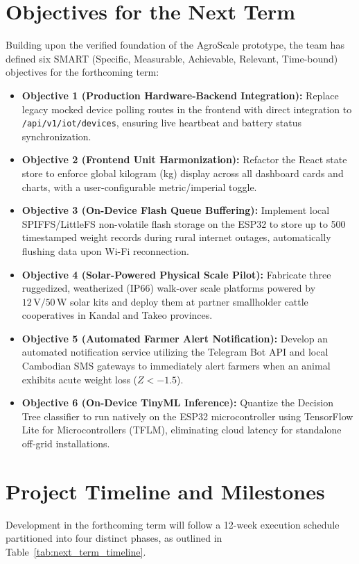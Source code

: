 \documentclass[11pt,a4paper]{report}
\begin{document}
\section{Objectives for the Next Term}
Building upon the verified foundation of the AgroScale prototype, the team has defined six SMART (Specific, Measurable, Achievable, Relevant, Time-bound) objectives for the forthcoming term:
\begin{itemize}
    \item \textbf{Objective 1 (Production Hardware-Backend Integration):} Replace legacy mocked device polling routes in the frontend with direct integration to \texttt{/api/v1/iot/devices}, ensuring live heartbeat and battery status synchronization.
    \item \textbf{Objective 2 (Frontend Unit Harmonization):} Refactor the React state store to enforce global kilogram (kg) display across all dashboard cards and charts, with a user-configurable metric/imperial toggle.
    \item \textbf{Objective 3 (On-Device Flash Queue Buffering):} Implement local SPIFFS/LittleFS non-volatile flash storage on the ESP32 to store up to 500 timestamped weight records during rural internet outages, automatically flushing data upon Wi-Fi reconnection.
    \item \textbf{Objective 4 (Solar-Powered Physical Scale Pilot):} Fabricate three ruggedized, weatherized (IP66) walk-over scale platforms powered by $12\,\text{V}/50\,\text{W}$ solar kits and deploy them at partner smallholder cattle cooperatives in Kandal and Takeo provinces.
    \item \textbf{Objective 5 (Automated Farmer Alert Notification):} Develop an automated notification service utilizing the Telegram Bot API and local Cambodian SMS gateways to immediately alert farmers when an animal exhibits acute weight loss ($Z < -1.5$).
    \item \textbf{Objective 6 (On-Device TinyML Inference):} Quantize the Decision Tree classifier to run natively on the ESP32 microcontroller using TensorFlow Lite for Microcontrollers (TFLM), eliminating cloud latency for standalone off-grid installations.
\end{itemize}

\section{Project Timeline and Milestones}
Development in the forthcoming term will follow a 12-week execution schedule partitioned into four distinct phases, as outlined in Table~\ref{tab:next_term_timeline}.
\end{document}
